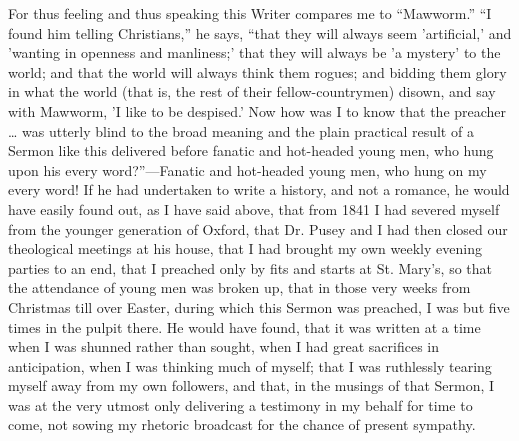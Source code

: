 For thus feeling and thus speaking this Writer compares me to ``Mawworm.'' ``I found him telling Christians,'' he
says, ``that they will always seem 'artificial,' and 'wanting in
openness and manliness;' that they will always be 'a mystery' to the
world; and that the world will always think them rogues; and bidding
them glory in what the world (that is, the rest of their
fellow-countrymen) disown, and say with Mawworm, 'I like to be
despised.' Now how was I to know that the preacher … was
utterly blind to the broad meaning and the plain practical result of a
Sermon like this delivered before fanatic and hot-headed young men, who
hung upon his every word?''—Fanatic and hot-headed young men, who hung on my every word! If he had undertaken to write a history, and not a romance, he would have easily found out, as I have said
above,
that from 1841 I had severed myself from the younger generation of
Oxford, that Dr. Pusey and I had then closed our theological meetings at
his house, that I had brought my own weekly evening parties to an end,
that I preached only by fits and starts at St. Mary's, so that the
attendance of young men was broken up, that in those very weeks from
Christmas till over Easter, during which this Sermon was preached, I was
but five times in the pulpit there. He would have found, that it was written at a time when I was shunned rather than
sought, when I had great sacrifices in anticipation, when I was thinking
much of myself; that I was ruthlessly tearing myself away from my own
followers, and that, in the musings of that Sermon, I was at the very
utmost only delivering a testimony in my behalf for time to come, not
sowing my rhetoric broadcast for the chance of present sympathy.

